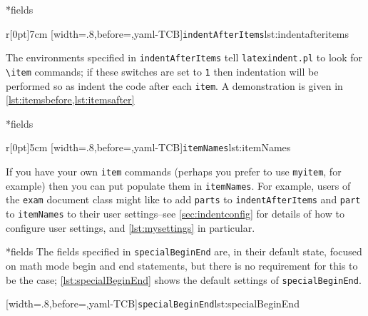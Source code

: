 
*{fields}
	\begin{wrapfigure}[5]{r}[0pt]{7cm}
		[width=.8\linewidth,before=\centering,yaml-TCB]{\texttt{indentAfterItems}}{lst:indentafteritems}
	\end{wrapfigure}
	The environments specified in \texttt{indentAfterItems}  tell
	\texttt{latexindent.pl} to look for \lstinline!\item! commands; if these switches are set to \texttt{1}
	then indentation will be performed so as indent the code after each \texttt{item}.
	A demonstration is given in \cref{lst:itemsbefore,lst:itemsafter}

	\begin{minipage}{.45\textwidth}
	\end{minipage}%
	\hfill
	\begin{minipage}{.45\textwidth}
	\end{minipage}

*{fields}
	\begin{wrapfigure}[5]{r}[0pt]{5cm}
		[width=.8\linewidth,before=\centering,yaml-TCB]{\texttt{itemNames}}{lst:itemNames}
	\end{wrapfigure}
	If you have your own \texttt{item} commands (perhaps you
	prefer to use \texttt{myitem}, for example)
	then you can put populate them in \texttt{itemNames}.
	For example, users of the \texttt{exam} document class might like to add
	\texttt{parts} to \texttt{indentAfterItems} and \texttt{part} to \texttt{itemNames}
	to their user settings--see \vref{sec:indentconfig} for details of how to configure user settings,
	and \vref{lst:mysettings} in particular.\label{page:examsettings}

*{fields}
	The fields specified in \texttt{specialBeginEnd} are, in their default state, focused on math mode begin and end statements, but
	there is no requirement for this to be the case; \cref{lst:specialBeginEnd} shows the
	default settings of \texttt{specialBeginEnd}.

	[width=.8\linewidth,before=\centering,yaml-TCB]{\texttt{specialBeginEnd}}{lst:specialBeginEnd}


